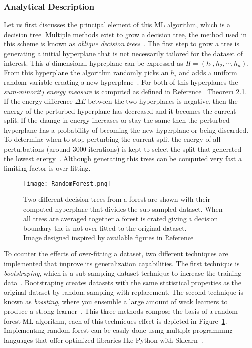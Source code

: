    
\subsubsection{Analytical Description}

 Let us first discusses the principal element of this ML algorithm, which is a decision tree. Multiple methods exist to grow a decision tree, the method used in this scheme is known as  \textit{oblique decision trees}~\cite{ho1995random}.  The first step to grow a tree is generating a initial hyperplane that is not necessarily tailored for the dataset of interest. This $d$-dimensional hypreplane can be expressed as $H=(h_{1},h_{2},\cdots,h_{d})$. From this hyperplane the algorithm randomly picks an $h_{i}$ and adds a uniform random variable creating a new hyperplane~\cite{heath1993induction}. For both of this hyperplanes the \textit{sum-minority energy measure} is computed as defined in Reference~\cite{heath1993induction} Theorem 2.1. If the energy difference $\Delta E$ between the two hyperplanes is negative, then the energy of the perturbed hyperplane has decreased and it becomes the current split. If the change in energy increases or stay the same then the perturbed hyperplane has a probability of becoming the new hyperplane or being discarded. To determine when to stop perturbing the current split the energy of all perturbations (around 3000 iterations) is kept to select the split that generated the lowest energy~\cite{heath1993induction}. Although generating this trees can be computed very fast a limiting factor is over-fitting.~\\

\begin{figure}[h]
\centering
\texttt{[image: RandomForest.png]}
\caption{ Two different decision trees from a forest are shown  with their computed hyperplane that divides the sub-sampled dataset. When all trees are averaged together a forest is crated giving a decision boundary the is not over-fitted to the original dataset.\\ {\scriptsize Image designed inspired by available figures in Reference~\cite{RFimg}} }
\label{fig:RFshow}
\end{figure}

To counter the effects of over-fitting a dataset, two different techniques are implemented that improve its generalization capabilities. The first technique is \textit{ bootstraping}, which is a sub-sampling dataset technique to increase the training data~\cite{friedman2002stochastic}. Bootstraping creates datasets with the same statistical properties as the original dataset by random sampling with replacement. The second technique is known as \textit{boosting}, where you ensemble a large amount of weak learners to produce a strong learner~\cite{hancock2012bootstrapping}. This three methods compose the basis of a random forest ML algorithm, each of this techniques effect is depicted in Figure~\ref{fig:RFshow}. Implementing random forest can be easily done using multiple programming languages that offer optimized libraries like Python with Sklearn~\cite{scikit-learn}.

